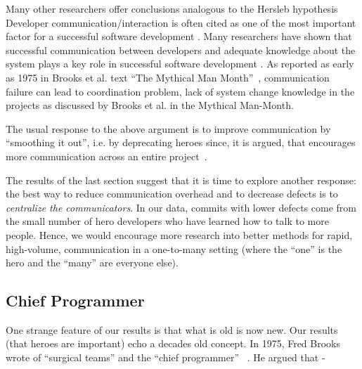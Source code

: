 \documentclass[sigconf,review]{acmart}
\begin{document}
Many other researchers offer conclusions analogous to the Hersleb hypothesis
 Developer communication/interaction is often cited as one of the most important factor for a successful software development \cite{Agile_software_development,Kraut:1995:CSD:203330.203345,1205177}. Many researchers have shown that successful communication between developers and adequate knowledge about the system plays a key role in successful software development \cite{TESCH2009657,Girba,841783}. As reported as early as 1975 in Brooks et al.  text ``The Mythical Man Month''~\cite{brooks1995mythical},
 communication failure can lead to coordination problem, lack of system change knowledge in the projects as discussed by Brooks et al. in the Mythical Man-Month.

The usual response to the above argument is to improve communication by ``smoothing it out'', i.e. by deprecating
heroes since, it is argued,  that encourages more communication across an entire project~\cite{bier2011online,boehm2006view,hislop2002integrating,morcovcomplex,wood2005multiview}.  





The results of the last section suggest that it is time to
explore  another response: the best way to reduce communication overhead and to decrease defects is to {\em centralize
the communicators}. In our data, commits with lower defects come from the small number of hero developers who have learned how to
talk to more people. Hence, we would encourage more research into better methods for rapid, high-volume, communication in a one-to-many setting (where the ``one'' is the hero and the ``many'' are everyone else).

\subsection{Chief Programmer}
One strange feature of our results is that what is old is now new.   Our results (that heroes are important) echo a decades old concept. In 1975, Fred Brooks wrote of  ``surgical teams'' and the ``chief programmer'' ~\cite{brooks1974mythical}. He argued that - 
\end{document}
